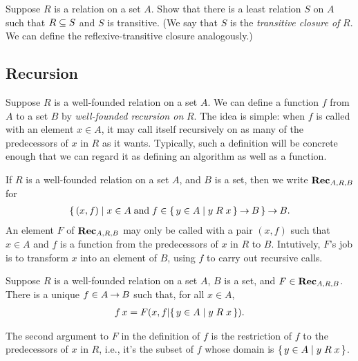 \begin{exercise}
\label{TransitiveClosure}
Suppose $R$ is a relation on a set $A$. Show that there is a least
relation $S$ on $A$ such that $R\subseteq S$ and $S$ is transitive. (We say
that $S$ is the \emph{transitive closure of} $R$. We can define the
reflexive-transitive closure analogously.)
%
%
\end{exercise}

%

\subsection{Recursion}

%
Suppose $R$ is a well-founded relation on a set $A$.  We can define a
function $f$ from $A$ to a set $B$ by \emph{well-founded recursion on}
$R$.  The idea is simple: when $f$ is called with an element $x\in A$,
it may call itself recursively on as many of the predecessors of $x$ in
$R$ as it wants.  Typically, such a definition will be concrete enough
that we can regard it as defining an algorithm as well as a function.

If $R$ is a well-founded relation on a set $A$, and $B$ is a set,
then we write $\mathbf{Rec}_{A,R,B}$ for
\begin{gather*}
\{ \, (x,f) \mid x\in A\;\allowbreak\mbox{and}\allowbreak\;f\in\{ \, y\in A \mid y\mathrel{R}x \, \}\mathbin{\to} B \, \}
\mathbin{\to} B .
\end{gather*}
An element $F$ of $\mathbf{Rec}_{A,R,B}$ may only be called with a pair
$(x,f)$ such that $x\in A$ and $f$ is a function from the predecessors
of $x$ in $R$ to $B$.  Intutively, $F$'s job is to transform $x$
into an element of $B$, using $f$ to carry out recursive calls.

\begin{theorem}
\label{WellFoundedRecursion}
Suppose $R$ is a well-founded relation on a set $A$, $B$ is
a set, and $F\in\mathbf{Rec}_{A,R,B}$.  There is a unique $f\in A\mathbin{\to} B$
such that, for all $x\in A$,
\begin{gather*}
f\,x = F(x, f\mathord{\mid}\{ \, y\in A \mid y\mathrel{R}x \, \}) .
\end{gather*}
\end{theorem}
 
The second argument to $F$ in the definition of $f$ is the restriction
of $f$ to the predecessors of $x$ in $R$, i.e., it's the subset of
$f$ whose domain is $\{ \, y\in A \mid y\mathrel{R}x \, \}$.

